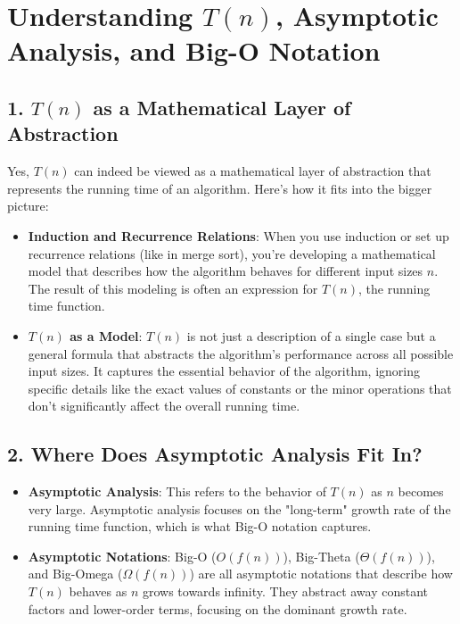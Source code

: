 \documentclass{article}
\begin{document}
\section*{Understanding \(T(n)\), Asymptotic Analysis, and Big-O Notation}

\subsection*{1. \(T(n)\) as a Mathematical Layer of Abstraction}

Yes, \(T(n)\) can indeed be viewed as a mathematical layer of abstraction that represents the running time of an algorithm. Here's how it fits into the bigger picture:

\begin{itemize}
    \item \textbf{Induction and Recurrence Relations}: When you use induction or set up recurrence relations (like in merge sort), you're developing a mathematical model that describes how the algorithm behaves for different input sizes \(n\). The result of this modeling is often an expression for \(T(n)\), the running time function.
  
    \item \textbf{\(T(n)\) as a Model}: \(T(n)\) is not just a description of a single case but a general formula that abstracts the algorithm’s performance across all possible input sizes. It captures the essential behavior of the algorithm, ignoring specific details like the exact values of constants or the minor operations that don't significantly affect the overall running time.
\end{itemize}

\subsection*{2. Where Does Asymptotic Analysis Fit In?}

\begin{itemize}
    \item \textbf{Asymptotic Analysis}: This refers to the behavior of \(T(n)\) as \(n\) becomes very large. Asymptotic analysis focuses on the "long-term" growth rate of the running time function, which is what Big-O notation captures.
  
    \item \textbf{Asymptotic Notations}: Big-O (\(O(f(n))\)), Big-Theta (\(\Theta(f(n))\)), and Big-Omega (\(\Omega(f(n))\)) are all asymptotic notations that describe how \(T(n)\) behaves as \(n\) grows towards infinity. They abstract away constant factors and lower-order terms, focusing on the dominant growth rate.
\end{itemize}
\end{document}

